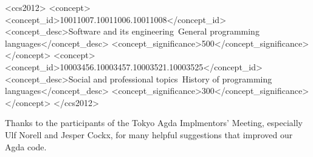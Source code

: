 \documentclass[sigplan,review]{acmart}\settopmatter{printfolios=true,printccs=false,printacmref=false}
\begin{document}
\begin{CCSXML}
<ccs2012>
<concept>
<concept_id>10011007.10011006.10011008</concept_id>
<concept_desc>Software and its engineering~General programming languages</concept_desc>
<concept_significance>500</concept_significance>
</concept>
<concept>
<concept_id>10003456.10003457.10003521.10003525</concept_id>
<concept_desc>Social and professional topics~History of programming languages</concept_desc>
<concept_significance>300</concept_significance>
</concept>
</ccs2012>
\end{CCSXML}




\maketitle


\begin{acks}                            %
  Thanks to the participants of the Tokyo Agda Implmentors' Meeting, especially Ulf Norell and Jesper Cockx,
  for many helpful suggestions that improved our Agda code.
\end{acks}



\end{document}
